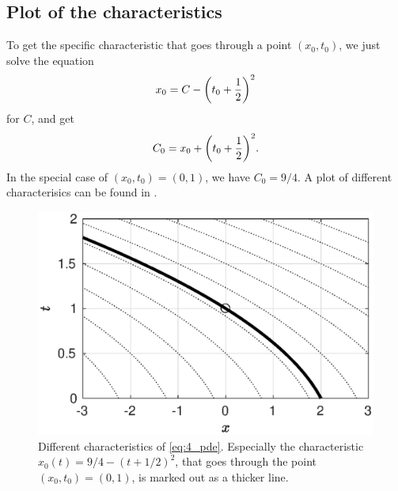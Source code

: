 \documentclass[11pt,letter, swedish, english
]{article}
\begin{document}
\subsection{Plot of the characteristics}

To get the specific characteristic that goes through a point
$(x_0, t_0)$, we just solve the equation
\begin{equation}
x_0 = C - \qty(t_0 + \frac{1}{2})^2
\end{equation}
for $C$, and get
\begin{equation}
C_0 = x_0 + \qty(t_0 + \frac{1}{2})^2.
\end{equation}
In the special case of $(x_0, t_0) = (0, 1)$, we have $C_0 = 9/4$. A
plot of different characterisics can be found in .

\begin{figure}
\centering
\includegraphics[width=.7\textwidth]{4b.eps}
\caption{Different characteristics of \eqref{eq:4_pde}. Especially the
  characteristic $x_0(t) = 9/4 -(t+1/2)^2$, that goes through the
  point $(x_0, t_0) = (0, 1)$, is marked out as a thicker line.} 
\label{fig:4b}
\end{figure}
\end{document}

